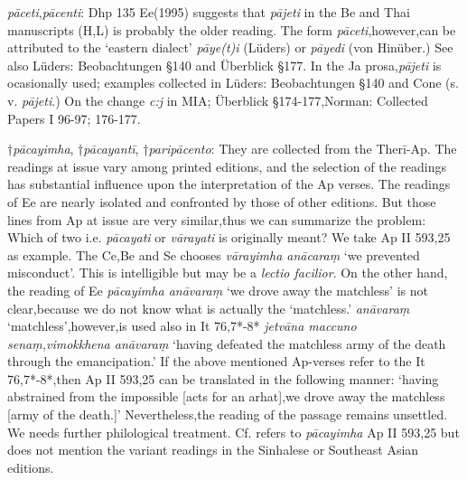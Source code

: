 \documentclass[11pt]{article}
\newcommand*\ṛ{r\symbol{"325}}
\newcommand*\Ṛ{R\symbol{"325}}
\newcommand*\ṝ{r\symbol{"304}\symbol{"325}}
\newcommand*\Ṝ{R\symbol{"304}\symbol{"325}}
\newcommand*\ḷ{l\symbol{"325}}
\newcommand*\ḹ{l\symbol{"304}\symbol{"325}}
\newcommand*\Ḷ{L\symbol{"325}}
\newcommand*\Ḹ{L\symbol{"304}\symbol{"325}}
\begin{document}
\textit{pāceti},\textit{pācenti}: Dhp 135 Ee(1995) suggests that \textit{pājeti} in the Be and Thai manuscripts (H,L) is probably the older reading.
The form \textit{pāceti},however,can be attributed to the `eastern dialect' \textit{pāye(t)i} (Lüders) or \textit{pāyedi} (von Hinüber.)
See also Lüders: Beobachtungen §140 and Überblick §177.
In the Ja prosa,\textit{pājeti} is ocasionally used; examples collected in Lüders: Beobachtungen §140 and Cone (s. v. \textit{pājeti}.)
On the change \textit{c:j} in MIA; Überblick §174-177,Norman: Collected Papers I 96-97; 176-177.

†\textit{pācayimha},
†\textit{pācayantī},
†\textit{paripācento}: They are collected from the Therī-Ap.
The readings at issue vary among printed editions,
and the selection of the readings has substantial influence upon the
interpretation of the Ap verses.
The readings of Ee are nearly isolated and confronted by those of other editions.
But those lines from Ap at issue are very similar,thus we can summarize the problem:
Which of two i.e. \textit{pācayati} or \textit{vārayati} is originally meant?
We take Ap II 593,25 as example.
The Ce,Be and Se chooses \textit{vārayimha anācaraṃ} `we prevented misconduct'.
This is intelligible but may be a \textit{lectio facilior}.
On the other hand,
the reading of Ee \textit{pācayimha anāvaraṃ} `we drove away the matchless' is not clear,because we do not know what is actually the `matchless.'
\textit{anāvaraṃ} `matchless',however,is used also in It 76,7*-8* \textit{jetvāna maccuno senaṃ,vimokkhena anāvaraṃ} `having defeated the matchless army of the death through the emancipation.' 
If the above mentioned Ap-verses refer to the It 76,7*-8*,then Ap II 593,25 can be translated in the following manner:
`having abstrained from the impossible [acts for an arhat],we drove away the matchless [army of the death.]'
Nevertheless,the reading of the passage remains unsettled. We needs further philological treatment.
 Cf. \citet[314]{Bechert:1958} refers to \textit{pācayimha} Ap II 593,25 but does not mention the variant readings in the Sinhalese or Southeast Asian editions.

%
%
\end{document}
